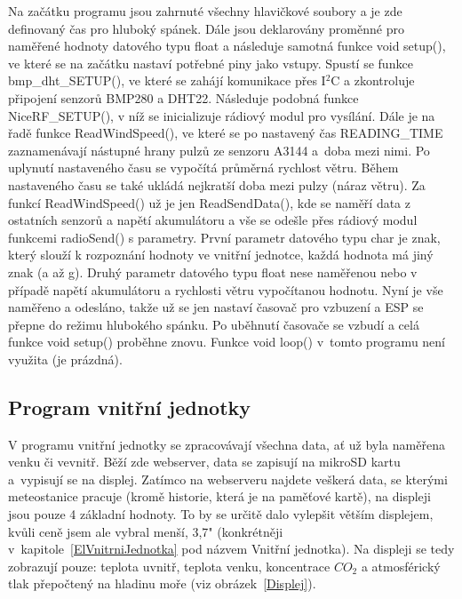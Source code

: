             Na začátku programu jsou zahrnuté všechny hlavičkové soubory a je zde definovaný čas pro hluboký spánek. Dále jsou deklarovány proměnné pro naměřené hodnoty datového typu float a následuje samotná funkce void setup(), ve které se na začátku nastaví potřebné piny jako vstupy. Spustí se funkce \hbox{bmp\_dht\_SETUP()}, ve které se zahájí komunikace přes I$^2$C a zkontroluje připojení senzorů BMP280 a DHT22. Následuje podobná funkce \hbox{NiceRF\_SETUP()}, v níž se inicializuje rádiový modul pro vysílání. Dále je na řadě funkce ReadWindSpeed(), ve které se po nastavený čas \hbox{READING\_TIME} zaznamenávají nástupné hrany pulzů ze senzoru A3144 a~doba mezi nimi. Po uplynutí nastaveného času se vypočítá průměrná rychlost větru. Během nastaveného času se také ukládá nejkratší doba mezi pulzy (náraz větru). Za funkcí ReadWindSpeed() už je jen ReadSendData(), kde se naměří data z ostatních senzorů a napětí akumulátoru a vše se odešle přes rádiový modul funkcemi radioSend() s parametry. První parametr datového typu char je znak, který slouží k rozpoznání hodnoty ve vnitřní jednotce, každá hodnota má jiný znak (a až g). Druhý parametr datového typu float nese naměřenou nebo v případě napětí akumulátoru a rychlosti větru vypočítanou hodnotu. Nyní je vše naměřeno a odesláno, takže už se jen nastaví časovač pro vzbuzení a ESP se přepne do režimu hlubokého spánku. Po uběhnutí časovače se vzbudí a celá funkce void setup() proběhne znovu. Funkce void loop() v~tomto programu není využita (je prázdná).

            \newpage

        \subsection{Program vnitřní jednotky}
            V programu vnitřní jednotky se  zpracovávají všechna data, ať už byla naměřena venku či vevnitř. Běží zde webserver, data se zapisují na mikroSD kartu a~vypisují se na displej. Zatímco na webserveru najdete veškerá data, se kterými meteostanice pracuje (kromě historie, která je na paměťové kartě), na displeji jsou pouze 4 základní hodnoty. To by se určitě dalo vylepšit větším displejem, kvůli ceně jsem ale vybral menší, 3,7" (konkrétněji v~kapitole~\ref{ElVnitrniJednotka} pod názvem Vnitřní jednotka). Na displeji se tedy zobrazují pouze: teplota uvnitř, teplota venku, koncentrace $CO_2$ a atmosférický tlak přepočtený na hladinu moře (viz obrázek~\ref{Displej}).


